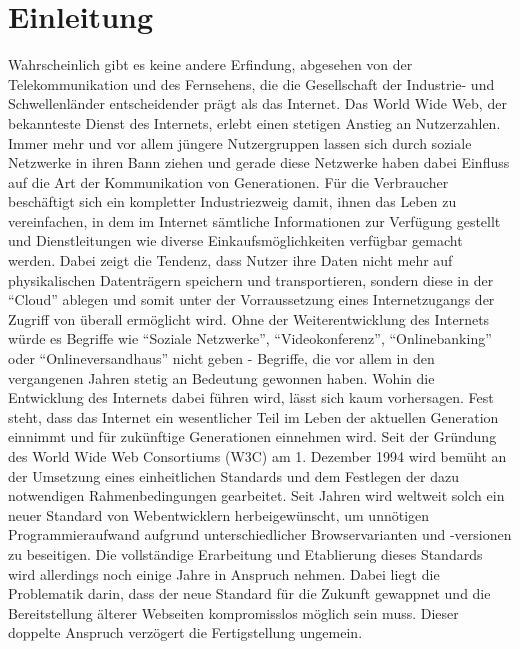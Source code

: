 \chapter{Einleitung}
Wahrscheinlich gibt es keine andere Erfindung, abgesehen von der
Telekommunikation und des Fernsehens, die die Gesellschaft der Industrie-
und Schwellenländer entscheidender prägt als das Internet.
Das World Wide Web, der bekannteste Dienst des Internets, erlebt einen
stetigen Anstieg an Nutzerzahlen. Immer mehr und vor allem jüngere
Nutzergruppen lassen sich durch soziale Netzwerke in ihren Bann ziehen und
gerade diese Netzwerke haben dabei Einfluss auf die Art der Kommunikation von
Generationen.
\newline\newline
Für die Verbraucher beschäftigt sich ein kompletter Industriezweig damit,
ihnen das Leben zu vereinfachen, in dem im Internet sämtliche Informationen
zur Verfügung gestellt und Dienstleitungen wie diverse Einkaufsmöglichkeiten
verfügbar gemacht werden. Dabei zeigt die Tendenz, dass Nutzer ihre Daten
nicht mehr auf physikalischen Datenträgern speichern und transportieren,
sondern diese in der ``Cloud'' ablegen und somit unter der Vorraussetzung
eines Internetzugangs der Zugriff von überall ermöglicht wird.
\newline\newline
Ohne der Weiterentwicklung des Internets würde es Begriffe wie "`Soziale
Netzwerke"', "`Videokonferenz"', "`Onlinebanking"' oder "`Onlineversandhaus"'
nicht geben - Begriffe, die vor allem in den vergangenen Jahren stetig an
Bedeutung gewonnen haben. Wohin die Entwicklung des Internets dabei führen
wird, lässt sich kaum vorhersagen. Fest steht, dass das Internet ein
wesentlicher Teil im Leben der aktuellen Generation einnimmt und für
zukünftige Generationen einnehmen wird.
\newline\newline
Seit der Gründung des World Wide Web Consortiums (W3C) am 1. Dezember 1994
wird bemüht an der Umsetzung eines einheitlichen Standards und dem Festlegen
der dazu notwendigen Rahmenbedingungen gearbeitet. Seit Jahren wird weltweit
solch ein neuer Standard von Webentwicklern herbeigewünscht, um unnötigen
Programmieraufwand aufgrund unterschiedlicher Browservarianten und -versionen
zu beseitigen.
\newline\newline
Die vollständige Erarbeitung und Etablierung dieses Standards wird allerdings
noch einige Jahre in Anspruch nehmen. Dabei liegt die Problematik darin, dass
der neue Standard für die Zukunft gewappnet und die Bereitstellung älterer
Webseiten kompromisslos möglich sein muss. Dieser doppelte Anspruch verzögert
die Fertigstellung ungemein.
\vfill

